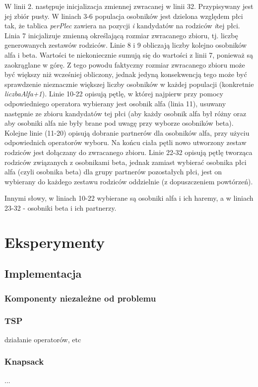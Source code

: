 \documentclass[twoside]{iisthesis}
\begin{document}
W linii 2. następuje inicjalizacja zmiennej zwracanej w linii 32. Przypisywany jest jej zbiór pusty.
W liniach 3-6 populacja osobników jest dzielona względem płci tak, że tablica \textit{perPlec} zawiera na pozycji \textit{i} kandydatów na rodziców \textit{i}tej płci.
Linia 7 inicjalizuje zmienną określającą rozmiar zwracanego zbioru, tj. liczbę generowanych zestawów rodziców.
Linie 8 i 9 obliczają liczby kolejno osobników alfa i beta. Wartości te niekoniecznie sumują się do wartości z linii 7, ponieważ są zaokrąglane w górę. Z tego powodu faktyczny rozmiar zwracanego zbioru może być większy niż wcześniej obliczony, jednak jedyną konsekwencją tego może być sprawdzenie nieznacznie większej liczby osobników w każdej populacji (konkretnie \textit{liczbaAlfa+1}).
Linie 10-22 opisują pętlę, w której najpierw przy pomocy odpowiedniego operatora wybierany jest osobnik alfa (linia 11), usuwany następnie ze zbioru kandydatów tej płci (aby każdy osobnik alfa był różny oraz aby osobniki alfa nie były brane pod uwagę przy wyborze osobników beta). Kolejne linie (11-20) opisują dobranie partnerów dla osobników alfa, przy użyciu odpowiednich operatorów wyboru. Na końcu ciała pętli nowo utworzony zestaw rodziców jest dołączany do zwracanego zbioru.
Linie 22-32 opisują pętlę tworząca rodziców związanych z osobnikami beta, jednak zamiast wybierać osobnika płci alfa (czyli osobnika beta) dla grupy partnerów pozostałych płci, jest on wybierany do każdego zestawu rodziców oddzielnie (z dopuszczeniem powtórzeń).

Innymi słowy, w liniach 10-22 wybierane są osobniki alfa i ich haremy, a w liniach 23-32 - osobniki beta i ich partnerzy.

\chapter{Eksperymenty}
\section{Implementacja}
\subsection{Komponenty niezależne od problemu}
\subsection{TSP}
działanie operatorów, etc
\subsection{Knapsack}
...
\end{document}
